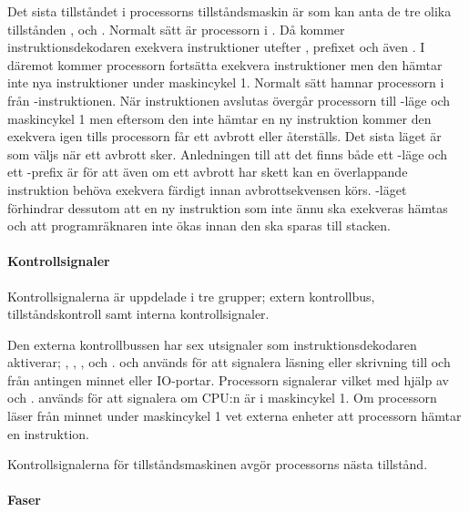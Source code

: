 \documentclass[main.tex]{subfiles}
\begin{document}
Det sista tillståndet i processorns tillståndsmaskin är  som kan
anta de tre olika tillstånden ,  och .
Normalt sätt är processorn i . Då kommer instruktionsdekodaren
exekvera instruktioner utefter , prefixet och även . I
 däremot kommer processorn fortsätta exekvera instruktioner men den
hämtar inte nya instruktioner under maskincykel 1. Normalt sätt hamnar
processorn i  från -instruktionen. När 
instruktionen  avslutas övergår processorn till -läge och
maskincykel 1 men eftersom den inte hämtar en ny instruktion kommer den
exekvera  igen tills processorn får ett avbrott eller återställs.
Det sista läget är  som väljs när ett avbrott sker. Anledningen
till att det finns både ett -läge och ett -prefix är
för att även om ett avbrott har skett kan en överlappande instruktion behöva
exekvera färdigt innan avbrottsekvensen körs. -läget förhindrar
dessutom att en ny instruktion som inte ännu ska exekveras hämtas och att
programräknaren inte ökas innan den ska sparas till stacken.

\paragraph{Kontrollsignaler}
Kontrollsignalerna är uppdelade i tre grupper; extern kontrollbus,
tillståndskontroll samt interna kontrollsignaler.

Den externa kontrollbussen har sex utsignaler som instruktionsdekodaren
aktiverar; , , ,  och .
 och  används för att signalera läsning eller skrivning till
och från antingen minnet eller IO-portar. Processorn signalerar vilket med
hjälp av  och .  används för att signalera om
CPU:n är i maskincykel 1. Om processorn läser från minnet under maskincykel 1
vet externa enheter att processorn hämtar en instruktion.

Kontrollsignalerna för tillståndsmaskinen avgör processorns nästa tillstånd.

\paragraph{Faser}
\end{document}
